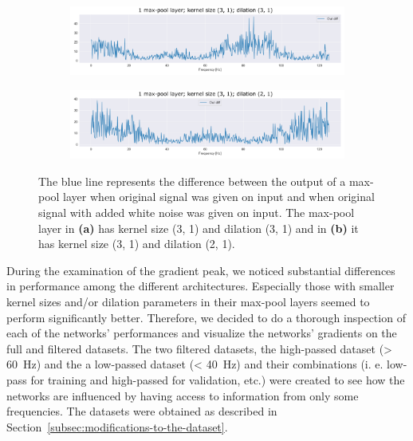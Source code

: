 \begin{figure}
\centering
\begin{subfigure}[b]{\textwidth}
   \includegraphics[width=1\linewidth]{img/ch4/absVel-maxpool-k3-d3}
   \caption{}
   \label{fig:maxpool-k3-d3} 
\end{subfigure}

\begin{subfigure}[b]{\textwidth}
   \includegraphics[width=1\linewidth]{img/ch4/absVel-maxpool-k3-d2}
   \caption{}
   \label{fig:maxpool-k3-d2}
\end{subfigure}

\caption[]{The blue line represents the difference between the output of a max-pool layer when original signal was given on input and when original signal with added white noise was given on input. The max-pool layer in \textbf{(a)} has kernel size (3, 1) and dilation (3, 1) and in \textbf{(b)} it has kernel size (3, 1) and dilation (2, 1).} 
\label{fig:max-pool-changes}
\end{figure}

During the examination of the gradient peak, we noticed substantial differences in performance among the different architectures.
Especially those with smaller kernel sizes and/or dilation parameters in their max-pool layers seemed to perform significantly better.
Therefore, we decided to do a thorough inspection of each of the networks' performances and visualize the networks' gradients on the full and filtered datasets. 
The two filtered datasets, the high-passed dataset (> 60~Hz) and the a low-passed dataset (< 40~Hz) and their combinations (i. e. low-pass for training and high-passed for validation, etc.) were created to see how the networks are influenced by having access to information from only some frequencies. The datasets were obtained as described in Section~\ref{subsec:modifications-to-the-dataset}.

